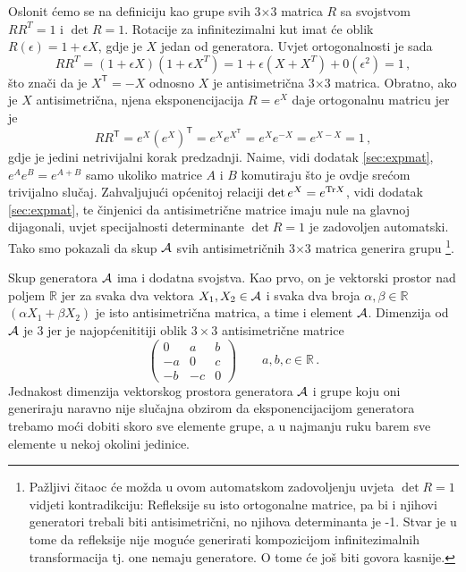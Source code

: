 Oslonit ćemo se na definiciju  kao grupe svih 
3$\times$3 matrica $R$ sa svojstvom  $RR^{T}=1$ i $\det R=1$.
Rotacije za infinitezimalni kut imat će oblik  $R(\epsilon)=1+\epsilon X$,
gdje je $X$ jedan od generatora. Uvjet ortogonalnosti je sada
\begin{equation}
 RR^{T}=(1+\epsilon X)(1+\epsilon 
   X^{T}) = 1+\epsilon (X+X^{T})+0(\epsilon^2) = 1 \,,
\end{equation}
što znači da je $X^\mathsf{T}=-X$ odnosno $X$ je antisimetrična 3$\times$3 matrica.
Obratno, ako je $X$ antisimetrična, njena eksponencijacija $R = e^X$ daje ortogonalnu
matricu jer je
\begin{equation}
  R R^\mathsf{T} = e^X (e^X)^\mathsf{T} = e^X e^{X^\mathsf{T}}
  = e^X e^{-X}
  = e^{X-X} = 1 \,,
\end{equation}
gdje je jedini netrivijalni korak predzadnji. Naime, vidi dodatak \ref{sec:expmat},
$e^{A} e^{B} = e^{A+B}$ samo ukoliko matrice $A$ i $B$ komutiraju što je ovdje
srećom trivijalno slučaj.
Zahvaljujući općenitoj relaciji $\det e^{X} = e^{\textrm{\scriptsize Tr} X}$,
vidi dodatak \ref{sec:expmat}, te činjenici da antisimetrične matrice imaju
nule na glavnoj dijagonali, uvjet specijalnosti determinante $\det R = 1$ je
zadovoljen automatski.
Tako smo pokazali da skup $\mathcal{A}$ svih antisimetričnih 3$\times$3 matrica
generira grupu \footnote{Pažljivi čitaoc će možda u ovom automatskom
    zadovoljenju uvjeta $\det R =1$ vidjeti kontradikciju:
 Refleksije su isto ortogonalne matrice,
pa bi i njihovi generatori trebali biti antisimetrični, no njihova determinanta
je -1. Stvar je u tome da refleksije nije moguće generirati kompozicijom
infinitezimalnih transformacija tj. one nemaju generatore. O tome će još biti
govora kasnije.\label{fus:refleksija}
}.

Skup generatora $\mathcal{A}$ ima i dodatna svojstva. Kao prvo, on je
vektorski prostor nad poljem $\mathbb{R}$ jer za svaka dva vektora
$X_1, X_2\in\mathcal{A}$ i svaka dva broja $\alpha, \beta\in\mathbb{R}$ 
$(\alpha X_1 + \beta X_2)$ je isto antisimetrična matrica, a time i
element $\mathcal{A}$. Dimenzija od $\mathcal{A}$ je 3 jer je najopćenititiji
oblik $3\times 3$ antisimetrične matrice
\begin{equation}
    \begin{pmatrix}
        0 &  a  &  b \\
       -a &  0  &  c \\
       -b & -c  &  0
   \end{pmatrix}  \qquad   a, b, c \in \mathbb{R} \,.
\end{equation}
Jednakost dimenzija vektorskog prostora generatora $\mathcal{A}$ i grupe  koju
oni generiraju naravno nije slučajna obzirom da eksponencijacijom
generatora trebamo moći dobiti skoro sve elemente grupe, a u najmanju ruku
barem sve elemente u nekoj okolini jedinice.

